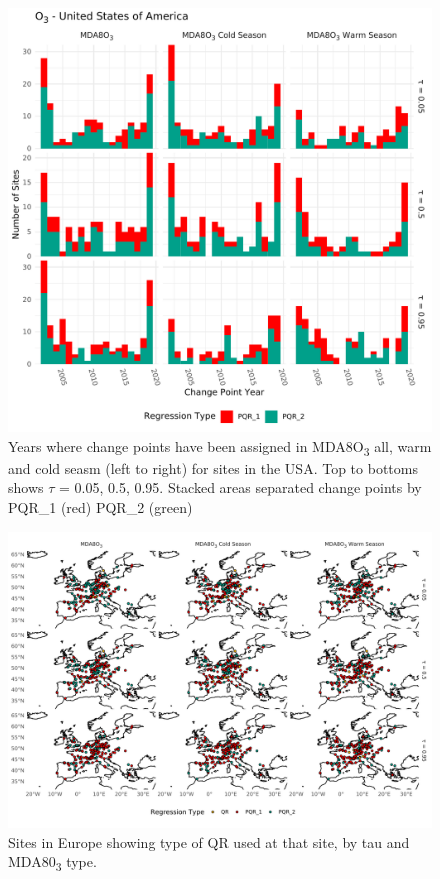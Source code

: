 \documentclass{article}
\begin{document}
\begin{figure}[p]
\centering
\includegraphics[width=\linewidth]{figures/si_figures/fS02_cp_year_o3_United-States-of-America.pdf}
\caption{Years where change points have been assigned in MDA8O\textsubscript{3} all, warm and cold seasm (left to right) for sites in the USA. Top to bottoms shows $\tau$ = 0.05, 0.5, 0.95. Stacked areas separated change points by PQR\_1 (red) PQR\_2 (green)}
\label{si_fig:cp_year_usa}
\end{figure}
\clearpage

\begin{figure}
\centering
\includegraphics[width=\linewidth]{figures/si_figures/fS03_regression_type_map_eu.pdf}
\caption{Sites in Europe showing type of QR used at that site, by tau and MDA80\textsubscript{3} type.}
\label{si_fig:reg_map_eu}
\end{figure}
\clearpage
\end{document}
